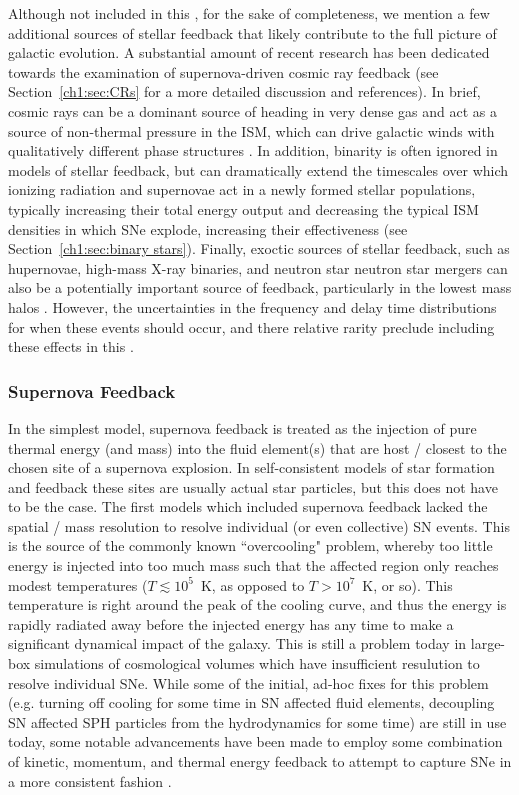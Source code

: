 Although not included in this \dissertation, for the sake of completeness, we mention a few additional sources of stellar feedback that likely contribute to the full picture of galactic evolution. A substantial amount of recent research has been dedicated towards the examination of supernova-driven cosmic ray feedback (see Section~\ref{ch1:sec:CRs} for a more detailed discussion and references). In brief, cosmic rays can be a dominant source of heading in very dense gas and act as a source of non-thermal pressure in the ISM, which can drive galactic winds with qualitatively different phase structures \citep[e.g.][]{SalemBryanCorlies}. In addition, binarity is often ignored in models of stellar feedback, but can dramatically extend the timescales over which ionizing radiation and supernovae act in a newly formed stellar populations, typically increasing their total energy output and decreasing the typical ISM densities in which SNe explode, increasing their effectiveness (see Section~\ref{ch1:sec:binary stars}). Finally, exoctic sources of stellar feedback, such as hupernovae, high-mass X-ray binaries, and neutron star neutron star mergers can also be a potentially important source of feedback, particularly in the lowest mass halos \citep[e.g.][]{Artale2015}. However, the uncertainties in the frequency and delay time distributions for when these events should occur, and there relative rarity preclude including these effects in this \dissertation.

\subsubsection{Supernova Feedback}
\label{intro:sec:supernovae}

In the simplest model, supernova feedback is treated as the injection of pure thermal energy (and mass) into the fluid element(s) that are host / closest to the chosen site of a supernova explosion. In self-consistent models of star formation and feedback these sites are usually actual star particles, but this does not have to be the case. The first models which included supernova feedback lacked the spatial / mass resolution to resolve individual (or even collective) SN events. This is the source of the commonly known ``overcooling" problem, whereby too little energy is injected into too much mass such that the affected region only reaches modest temperatures ($T \lesssim 10^5$~K, as opposed to $T > 10^7$~K, or so). This temperature is right around the peak of the cooling curve, and thus the energy is rapidly radiated away before the injected energy has any time to make a significant dynamical impact of the galaxy. This is still a problem today in large-box simulations of cosmological volumes which have insufficient resulution to resolve individual SNe. While some of the initial, ad-hoc fixes for this problem (e.g. turning off cooling for some time in SN affected fluid elements, decoupling SN affected SPH particles from the hydrodynamics for some time) are still in use today, some notable advancements have been made to employ some combination of kinetic, momentum, and thermal energy feedback to attempt to capture SNe in a more consistent fashion \citep[e.g.][]{FIRE,Simpson2015,Hopkins2018}.

